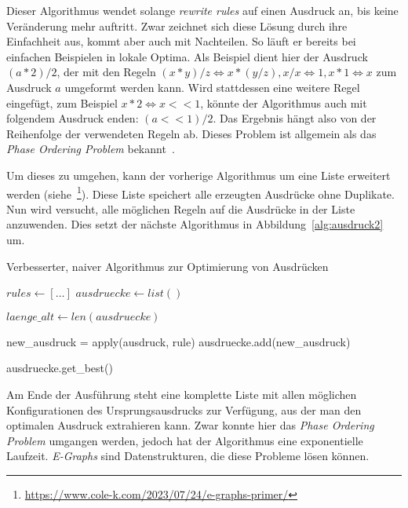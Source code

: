 Dieser Algorithmus wendet solange \textit{rewrite rules} auf einen Ausdruck an, bis keine Veränderung mehr auftritt.
Zwar zeichnet sich diese Lösung durch ihre Einfachheit aus, kommt aber auch mit Nachteilen.
So läuft er bereits bei einfachen Beispielen in lokale Optima. 
Als Beispiel dient hier der Ausdruck $(a * 2) / 2$, der mit den Regeln $(x * y) / z \Leftrightarrow x * (y / z), x / x \Leftrightarrow 1, x * 1 \Leftrightarrow x$ 
zum Ausdruck $a$ umgeformt werden kann.
Wird stattdessen eine weitere Regel eingefügt, zum Beispiel $x * 2 \Leftrightarrow x << 1$, könnte der Algorithmus auch mit folgendem Ausdruck enden: $(a << 1) / 2$.
Das Ergebnis hängt also von der Reihenfolge der verwendeten Regeln ab. Dieses Problem ist allgemein als das \textit{Phase Ordering Problem} bekannt~\cite{phaseorder-2009}.

\noindent Um dieses zu umgehen, kann der vorherige Algorithmus um eine Liste erweitert werden (siehe~\footnote{\url{https://www.cole-k.com/2023/07/24/e-graphs-primer/}}).
Diese Liste speichert alle erzeugten Ausdrücke ohne Duplikate. Nun wird versucht, alle möglichen Regeln auf die Ausdrücke in der Liste anzuwenden. 
Dies setzt der nächste Algorithmus in Abbildung~\ref{alg:ausdruck2} um.

\begin{algorithm}[H]
  \caption{Verbesserter, naiver Algorithmus zur Optimierung von Ausdrücken}\label{alg:ausdruck2}
  \begin{algorithmic}
    \State $rules \gets [\ldots]$
    \State $ausdruecke \gets list()$
    
      \State $laenge\_alt \gets len(ausdruecke)$

          \State new\_ausdruck = apply(ausdruck, rule)
          \State ausdruecke.add(new\_ausdruck)
          \EndIf
        \EndFor
      \EndFor
    \EndWhile

    \State \Return ausdruecke.get\_best()
    \EndFunction
  \end{algorithmic}
\end{algorithm}

Am Ende der Ausführung steht eine komplette Liste mit allen möglichen Konfigurationen des Ursprungsausdrucks zur Verfügung, aus der man den optimalen Ausdruck extrahieren kann.
Zwar konnte hier das \textit{Phase Ordering Problem} umgangen werden, jedoch hat der Algorithmus eine exponentielle Laufzeit.
\textit{E-Graphs} sind Datenstrukturen, die diese Probleme lösen können.

